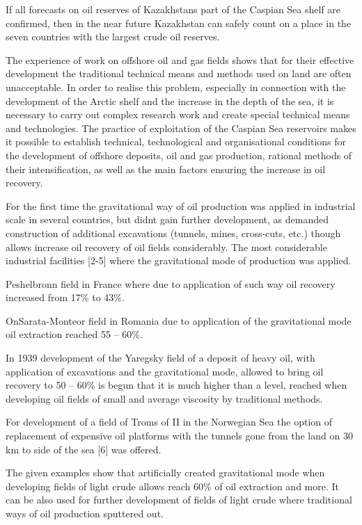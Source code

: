 \begin{multicols}{2}
If all forecasts on oil reserves of Kazakhstan\textquotesingle s part of
the Caspian Sea shelf are confirmed, then in the near future Kazakhstan
can safely count on a place in the seven countries with the largest
crude oil reserves.

The experience of work on offshore oil and gas fields shows that for
their effective development the traditional technical means and methods
used on land are often unacceptable. In order to realise this problem,
especially in connection with the development of the Arctic shelf and
the increase in the depth of the sea, it is necessary to carry out
complex research work and create special technical means and
technologies. The practice of exploitation of the Caspian Sea reservoirs
makes it possible to establish technical, technological and
organisational conditions for the development of offshore deposits, oil
and gas production, rational methods of their intensification, as well
as the main factors ensuring the increase in oil recovery.

For the first time the gravitational way of oil production was applied
in industrial scale in several countries, but didn\textquotesingle t
gain further development, as demanded construction of additional
excavations (tunnels, mines, cross-cuts, etc.) though allows increase
oil recovery of oil fields considerably. The most considerable
industrial facilities {[}2-5{]} where the gravitational mode of
production was applied.

Peshelbronn field in France where due to application of such way oil
recovery increased from 17\% to 43\%.

OnSarata-Monteor field in Romania due to application of the
gravitational mode oil extraction reached 55 -- 60\%.

In 1939 development of the Yaregsky field of a deposit of heavy oil,
with application of excavations and the gravitational mode, allowed to
bring oil recovery to 50 -- 60\% is begun that it is much higher than a
level, reached when developing oil fields of small and average viscosity
by traditional methods.

For development of a field of Troms of II in the Norwegian Sea the
option of replacement of expensive oil platforms with the tunnels gone
from the land on 30 km to side of the sea {[}6{]} was offered.

The given examples show that artificially created gravitational mode
when developing fields of light crude allows reach 60\% of oil
extraction and more. It can be also used for further development of
fields of light crude where traditional ways of oil production sputtered
out.


\end{multicols}
